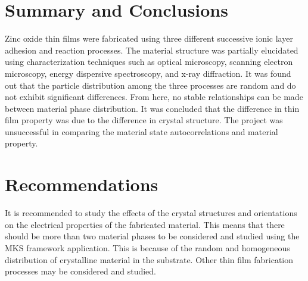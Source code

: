 \chapter{Summary and Conclusions}

Zinc oxide thin films were fabricated using three different successive ionic layer adhesion and reaction processes.
The material structure was partially elucidated using characterization techniques such as optical microscopy, scanning electron microscopy, energy dispersive spectroscopy, and x-ray diffraction.
It was found out that the particle distribution among the three processes are random and do not exhibit significant differences.
From here, no stable relationships can be made between material phase distribution.
It was concluded that the difference in thin film property was due to the difference in crystal structure.
The project was unsuccessful in comparing the material state autocorrelations and material property.

\chapter{Recommendations}

It is recommended to study the effects of the crystal structures and orientations on the electrical properties of the fabricated material.
This means that there should be more than two material phases to be considered and studied using the MKS framework application.
This is because of the random and homogeneous distribution of crystalline material in the substrate.
Other thin film fabrication processes may be considered and studied.
